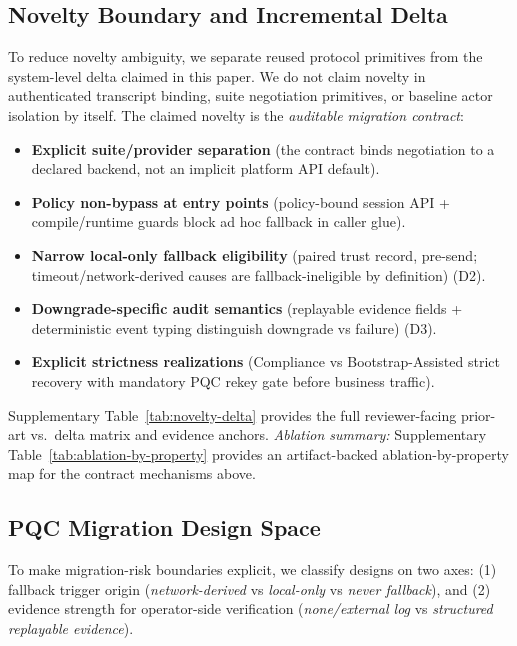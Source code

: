 \documentclass[10pt,journal,compsoc]{IEEEtran}
\providecommand{\tightlist}{%
  \setlength{\itemsep}{0pt}\setlength{\parskip}{0pt}}
\begin{document}
\subsection{Novelty Boundary and Incremental
Delta}\label{sec:novelty-delta}

To reduce novelty ambiguity, we separate reused protocol primitives from
the system-level delta claimed in this paper. We do not claim novelty in
authenticated transcript binding, suite negotiation primitives, or
baseline actor isolation by itself. The claimed novelty is the
\emph{auditable migration contract}:
\begin{itemize}\tightlist
\item \textbf{Explicit suite/provider separation} (the contract binds negotiation to a declared backend, not an implicit platform API default).
\item \textbf{Policy non-bypass at entry points} (policy-bound session API + compile/runtime guards block ad hoc fallback in caller glue).
\item \textbf{Narrow local-only fallback eligibility} (paired trust record, pre-send; timeout/network-derived causes are fallback-ineligible by definition) (D2).
\item \textbf{Downgrade-specific audit semantics} (replayable evidence fields + deterministic event typing distinguish downgrade vs failure) (D3).
\item \textbf{Explicit strictness realizations} (Compliance vs Bootstrap-Assisted strict recovery with mandatory PQC rekey gate before business traffic).
\end{itemize}
Supplementary Table~\ref{tab:novelty-delta} provides the full reviewer-facing prior-art vs.\ delta matrix and evidence anchors.
\textit{Ablation summary:} Supplementary Table~\ref{tab:ablation-by-property} provides an artifact-backed ablation-by-property map for the contract mechanisms above.

\subsection{PQC Migration Design
Space}\label{sec:migration-design-space}

To make migration-risk boundaries explicit, we classify designs on two
axes: (1) fallback trigger origin (\emph{network-derived} vs
\emph{local-only} vs \emph{never fallback}), and (2) evidence strength
for operator-side verification (\emph{none/external log} vs
\emph{structured replayable evidence}).
\end{document}
